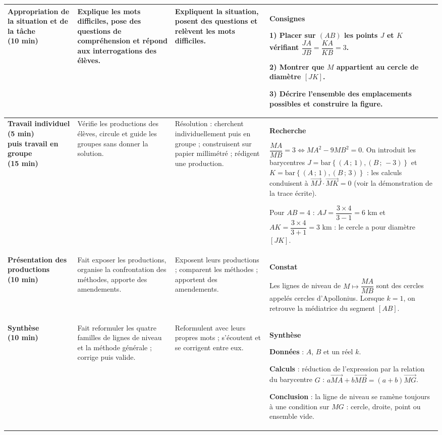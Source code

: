 \documentclass[10pt,a4paper]{article}
\providecommand{\hl}[1]{\colorbox{cHl}{#1}}                  %
\newcommand{\vc}[1]{\overrightarrow{#1}}                     %
\newcommand{\barG}[1]{\mathrm{bar}\left\{#1\right\}}          %
\begin{document}
{\begin{longtable}{|L{3.0cm}|L{4.5cm}|L{3.5cm}|L{5.5cm}|}
\textbf{\color{cEx}Appropriation de la situation et de la tâche\newline(10 min)}
& Explique les mots difficiles, pose des questions de compréhension et répond aux interrogations des élèves.
& Expliquent la situation, posent des questions et relèvent les mots difficiles.
& \textbf{\color{cEx}Consignes}\par
1) Placer sur $(AB)$ les points $J$ et $K$ vérifiant $\dfrac{JA}{JB}=\dfrac{KA}{KB}=3$.\par
2) Montrer que $M$ appartient au cercle de diamètre $[JK]$.\par
3) Décrire l'ensemble des emplacements possibles et construire la figure.
\\\hline

\textbf{\color{cMeth}Travail individuel\newline(5 min)\newline puis travail en groupe\newline(15 min)}
& Vérifie les productions des élèves, circule et guide les groupes sans donner la solution.
& Résolution : cherchent individuellement puis en groupe ; construisent sur papier millimétré ; rédigent une production.
& \textbf{\color{cMeth}Recherche}\par
$\dfrac{MA}{MB}=3 \Longleftrightarrow MA^2-9MB^2=0$. On introduit les barycentres $J=\barG{(A\,;\,1),(B\,;\,-3)}$ et $K=\barG{(A\,;\,1),(B\,;\,3)}$ : les calculs conduisent à $\vc{MJ}\cdot\vc{MK}=0$ (voir la démonstration de la trace écrite).\par
Pour $AB=4$ : $AJ=\dfrac{3\times 4}{3-1}=6$ km et $AK=\dfrac{3\times 4}{3+1}=3$ km : le cercle a pour diamètre $[JK]$.
\\\hline

\textbf{\color{cProp}Présentation des productions\newline(10 min)}
& Fait exposer les productions, organise la confrontation des méthodes, apporte des amendements.
& Exposent leurs productions ; comparent les méthodes ; apportent des amendements.
& \textbf{\color{cProp}Constat}\par
Les lignes de niveau de $M\mapsto \dfrac{MA}{MB}$ sont des cercles appelés \hl{cercles d'Apollonius}. Lorsque $k=1$, on retrouve la \hl{médiatrice} du segment $[AB]$.
\\\hline

\textbf{\color{cProp}Synthèse\newline(10 min)}
& Fait reformuler les quatre familles de lignes de niveau et la méthode générale ; corrige puis valide.
& Reformulent avec leurs propres mots ; s'écoutent et se corrigent entre eux.
& \textbf{\color{cProp}Synthèse}\par
\textbf{Données} : $A$, $B$ et un réel $k$.\par
\textbf{Calculs} : réduction de l'expression par la relation du barycentre $G$ : $a\vc{MA}+b\vc{MB}=(a+b)\vc{MG}$.\par
\textbf{Conclusion} : la ligne de niveau se ramène toujours à une condition sur $MG$ : cercle, droite, point ou ensemble vide.
\\\hline


\end{longtable}}
\end{document}
